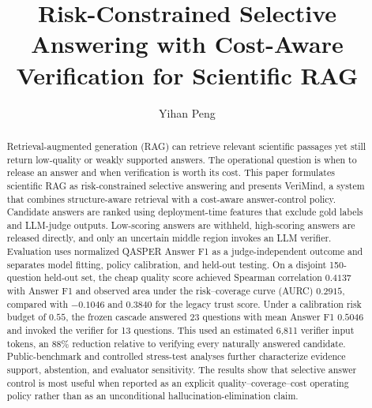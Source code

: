 \documentclass[smallextended]{svjour3}
\begin{document}
\title{Risk-Constrained Selective Answering with Cost-Aware Verification for Scientific RAG}

\author{Yihan Peng}


\date{}

\maketitle

\begin{abstract}
Retrieval-augmented generation (RAG) can retrieve relevant scientific passages yet still return low-quality or weakly supported answers. The operational question is when to release an answer and when verification is worth its cost. This paper formulates scientific RAG as risk-constrained selective answering and presents VeriMind, a system that combines structure-aware retrieval with a cost-aware answer-control policy. Candidate answers are ranked using deployment-time features that exclude gold labels and LLM-judge outputs. Low-scoring answers are withheld, high-scoring answers are released directly, and only an uncertain middle region invokes an LLM verifier. Evaluation uses normalized QASPER Answer F1 as a judge-independent outcome and separates model fitting, policy calibration, and held-out testing. On a disjoint 150-question held-out set, the cheap quality score achieved Spearman correlation $0.4137$ with Answer F1 and observed area under the risk--coverage curve (AURC) $0.2915$, compared with $-0.1046$ and $0.3840$ for the legacy trust score. Under a calibration risk budget of $0.55$, the frozen cascade answered 23 questions with mean Answer F1 $0.5046$ and invoked the verifier for 13 questions. This used an estimated 6,811 verifier input tokens, an $88\%$ reduction relative to verifying every naturally answered candidate. Public-benchmark and controlled stress-test analyses further characterize evidence support, abstention, and evaluator sensitivity. The results show that selective answer control is most useful when reported as an explicit quality--coverage--cost operating policy rather than as an unconditional hallucination-elimination claim.
\end{abstract}
\end{document}
